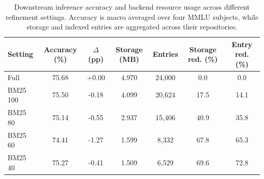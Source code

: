 \begin{table}[t]
    \centering
    \caption{Downstream inference accuracy and backend resource usage across different
    refinement settings. Accuracy is macro averaged over four MMLU subjects, while storage
    and indexed entries are aggregated across their repositories.}
    \label{tab:quality_resource}
    \begin{tabular}{lcccccc}
        \hline
        Setting & Accuracy (\%) & $\Delta$ (pp) & Storage (MB) & Entries
        & Storage red. (\%) & Entry red. (\%) \\
        \hline
        Full & 75.68 & +0.00 & 4.970 & 24,000 & 0.0 & 0.0 \\
        BM25 100 & 75.50 & -0.18 & 4.099 & 20,624 & 17.5 & 14.1 \\
        BM25 80 & 75.14 & -0.55 & 2.937 & 15,406 & 40.9 & 35.8 \\
        BM25 60 & 74.41 & -1.27 & 1.599 & 8,332 & 67.8 & 65.3 \\
        BM25 40 & 75.27 & -0.41 & 1.509 & 6,529 & 69.6 & 72.8 \\
        \hline
    \end{tabular}
\end{table}
